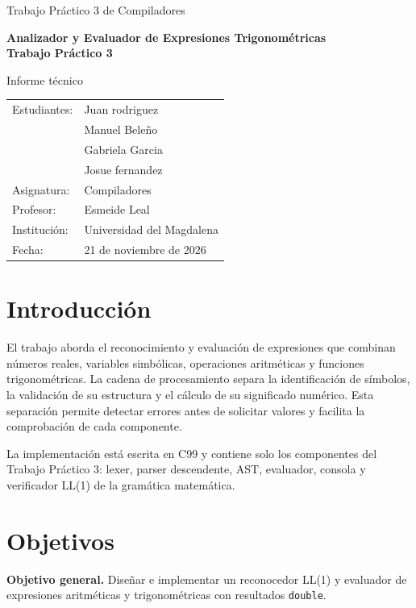 \documentclass[11pt,a4paper]{article}
\begin{document}
\begin{titlepage}
\centering
\vspace*{3cm}
{\Large Trabajo Práctico 3 de Compiladores\par}
\vspace{1cm}
{\LARGE\bfseries Analizador y Evaluador de Expresiones Trigonométricas\\[0.3cm] \textemdash{} Trabajo Práctico 3\par}
\vspace{2cm}
{\large Informe técnico\par}
\vspace{2cm}
\begin{tabular}{ll}
Estudiantes: & Juan rodriguez \\
             & Manuel Beleño \\
             & Gabriela Garcia \\
             & Josue fernandez \\[0.5cm]
Asignatura: & Compiladores \\
Profesor: & Esmeide Leal \\
Institución: & Universidad del Magdalena \\
Fecha: & 21 de noviembre de 2026 \\
\end{tabular}
\vfill
\end{titlepage}
\tableofcontents
\newpage
\section{Introducción}
El trabajo aborda el reconocimiento y evaluación de expresiones que combinan números reales, variables simbólicas, operaciones aritméticas y funciones trigonométricas. La cadena de procesamiento separa la identificación de símbolos, la validación de su estructura y el cálculo de su significado numérico. Esta separación permite detectar errores antes de solicitar valores y facilita la comprobación de cada componente.

La implementación está escrita en C99 y contiene solo los componentes del Trabajo Práctico 3: lexer, parser descendente, AST, evaluador, consola y verificador LL(1) de la gramática matemática.
\section{Objetivos}
\textbf{Objetivo general.} Diseñar e implementar un reconocedor LL(1) y evaluador de expresiones aritméticas y trigonométricas con resultados \texttt{double}.
\end{document}
